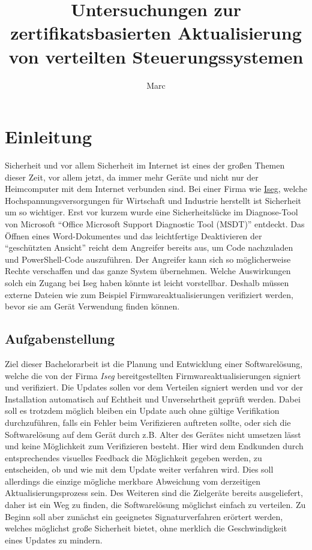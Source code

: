 \documentclass[thesis=bachelor,faculty=cb]{hsmw-thesis}
\title[Research on the certificate-based updating of embedded control systems]{Untersuchungen zur zertifikatsbasierten Aktualisierung von verteilten Steuerungssystemen}
\author{Marc}{Ulbricht}
\begin{document}
\chapter{Einleitung}
Sicherheit und vor allem Sicherheit im Internet ist eines der großen Themen dieser Zeit, vor allem jetzt, da immer mehr Geräte und nicht nur der Heimcomputer mit dem Internet verbunden sind. Bei einer Firma wie \href{https://iseg-hv.com/de/}{Iseg}, welche Hochspannungsversorgungen für Wirtschaft und Industrie herstellt ist Sicherheit um so wichtiger. Erst vor kurzem wurde eine Sicherheitslücke \cite{0Day} im Diagnose-Tool von Microsoft \enquote{Office Microsoft Support Diagnostic Tool (MSDT)} entdeckt.
Das Öffnen eines Word-Dokumentes und das leichtfertige Deaktivieren der \enquote{geschützten Ansicht} reicht dem Angreifer bereits aus, um Code nachzuladen und PowerShell-Code auszuführen.
Der Angreifer kann sich so möglicherweise Rechte verschaffen und das ganze System übernehmen. Welche Auswirkungen solch ein Zugang bei Iseg haben könnte ist leicht vorstellbar.
\newline
Deshalb müssen externe Dateien wie zum Beispiel Firmwareaktualisierungen verifiziert werden, bevor sie am Gerät Verwendung finden können.
\newpage
\section{Aufgabenstellung}
Ziel dieser Bachelorarbeit ist die Planung und Entwicklung einer Softwarelösung, welche die von der Firma \textit{Iseg} bereitgestellten Firmwareaktualisierungen signiert und verifiziert. Die Updates sollen vor dem Verteilen signiert werden und vor der Installation automatisch auf Echtheit und Unversehrtheit geprüft werden. Dabei soll es trotzdem möglich bleiben ein Update auch ohne gültige Verifikation durchzuführen, falls ein Fehler beim Verifizieren auftreten sollte, oder sich die Softwarelösung auf dem Gerät durch z.B. Alter des Gerätes nicht umsetzen lässt und keine Möglichkeit zum Verifizieren besteht.
\noindent
Hier wird dem Endkunden durch entsprechendes visuelles Feedback die Möglichkeit gegeben werden, zu entscheiden, ob und wie mit dem Update weiter verfahren wird. Dies soll allerdings die einzige mögliche merkbare Abweichung vom derzeitigen Aktualisierungsprozess sein.
Des Weiteren sind die Zielgeräte bereits ausgeliefert, daher ist ein Weg zu finden, die Softwarelösung möglichst einfach zu verteilen. 
Zu Beginn soll aber zunächst ein geeignetes Signaturverfahren erörtert werden, welches möglichst große Sicherheit bietet, ohne merklich die Geschwindigkeit eines Updates zu mindern.
\end{document}
